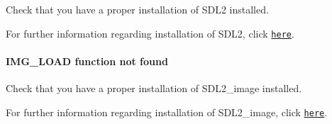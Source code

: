 Check that you have a proper installation of S\+D\+L2 installed.

For further information regarding installation of S\+D\+L2, click \href{https://www.libsdl.org/download-2.0.php}{\tt here}.

\paragraph*{I\+M\+G\+\_\+\+L\+O\+A\+D function not found}

Check that you have a proper installation of S\+D\+L2\+\_\+image installed.

For further information regarding installation of S\+D\+L2\+\_\+image, click \href{https://www.libsdl.org/projects/SDL_image/}{\tt here}. 